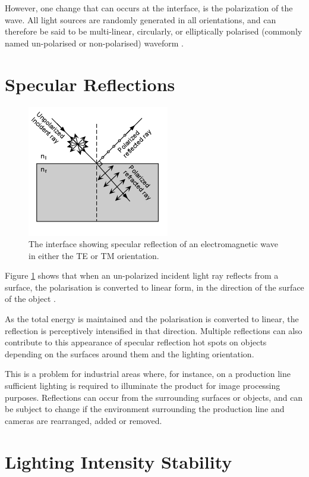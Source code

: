 \documentclass[fleqn,twoside,12pt]{report}
\begin{document}
However, one change that can occurs at the interface, is the polarization of the wave. All light sources are randomly generated in all orientations, and can therefore be said to be multi-linear, circularly, or elliptically polarised (commonly named un-polarised or non-polarised) waveform \cite{artusi,nelson}.


\section{Specular Reflections} 

\begin{figure}[h]
	\centering
	\includegraphics[scale=0.9]{unpolar_polar.png}
	\caption{The interface showing specular reflection of an electromagnetic wave in either the TE or TM orientation.}
	\label{fig:unpolar_polar}
\end{figure}

Figure \ref{fig:unpolar_polar} shows that when an un-polarized incident light ray reflects from a surface, the polarisation is converted to linear form, in the direction of the surface of the object \cite{nelson}.

As the total energy is maintained and the polarisation is converted to linear, the reflection is perceptively intensified in that direction. Multiple reflections can also contribute to this appearance of specular reflection hot spots on objects depending on the surfaces around them and the lighting orientation.

This is a problem for industrial areas where, for instance, on a production line sufficient lighting is required to illuminate the product for image processing purposes. Reflections can occur from the surrounding surfaces or objects, and can be subject to change if the environment surrounding the production line and cameras are rearranged, added or removed.


\section{Lighting Intensity Stability}
\end{document}
